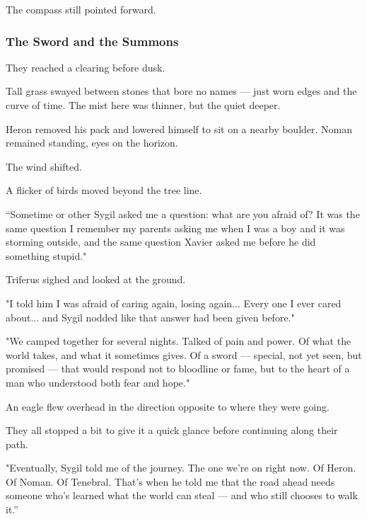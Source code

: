 \documentclass[12pt]{article}
\begin{document}
The compass still pointed forward.

\dotfill

\subsubsection*{The Sword and the Summons}

They reached a clearing before dusk.

Tall grass swayed between stones that bore no names — just worn edges and the curve of time. The mist here was thinner, but the quiet deeper.

Heron removed his pack and lowered himself to sit on a nearby boulder. Noman remained standing, eyes on the horizon.

The wind shifted.

A flicker of birds moved beyond the tree line.

\vspace{1em}

“Sometime or other Sygil asked me a question: what are you afraid of? It was the same question I remember my parents asking me when I was a boy and it was storming outside, and the same question Xavier asked me before he did something stupid."

Triferus sighed and looked at the ground.

"I told him I was afraid of caring again, losing again... Every one I ever cared about... and Sygil nodded like that answer had been given before."

\vspace{1em}

"We camped together for several nights. Talked of pain and power. Of what the world takes, and what it sometimes gives. Of a sword — special, not yet seen, but promised — that would respond not to bloodline or fame, but to the heart of a man who understood both fear and hope."

An eagle flew overhead in the direction opposite to where they were going.

They all stopped a bit to give it a quick glance before continuing along their path.

"Eventually, Sygil told me of the journey. The one we're on right now. Of Heron. Of Noman. Of Tenebral. That's when he told me that the road ahead needs someone who’s learned what the world can steal — and who still chooses to walk it.”

\vspace{1em}
\end{document}
